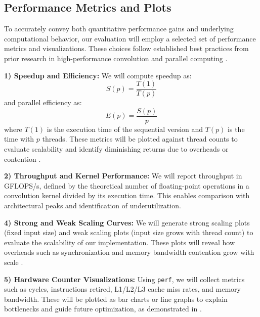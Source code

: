 \documentclass[conference, 10pt]{IEEEtran}
\begin{document}
\subsection{Performance Metrics and Plots}

To accurately convey both quantitative performance gains and underlying computational behavior, our evaluation will employ a selected set of performance metrics and visualizations. These choices follow established best practices from prior research in high-performance convolution and parallel computing \cite{Wang2023-ve,  hager2021hpc, Rajput2013-qn, Yoon2012-sx}.

\vspace{0.5em}
\textbf{1) Speedup and Efficiency:} 
We will compute speedup as:
\begin{equation}
    S(p) = \frac{T(1)}{T(p)}
\end{equation}
and parallel efficiency as:
\begin{equation}
    E(p) = \frac{S(p)}{p}
\end{equation}
where \(T(1)\) is the execution time of the sequential version and \(T(p)\) is the time with \(p\) threads. These metrics will be plotted against thread counts to evaluate scalability and identify diminishing returns due to overheads or contention \cite{Rajput2013-qn}.

\vspace{0.5em}
\textbf{2) Throughput and Kernel Performance:} 
We will report throughput in GFLOPS/s, defined by the theoretical number of floating-point operations in a convolution kernel divided by its execution time. This enables comparison with architectural peaks and identification of underutilization.

\vspace{0.5em}
\textbf{4) Strong and Weak Scaling Curves:} 
We will generate strong scaling plots (fixed input size) and weak scaling plots (input size grows with thread count) to evaluate the scalability of our implementation. These plots will reveal how overheads such as synchronization and memory bandwidth contention grow with scale \cite{hager2021hpc}.

\vspace{0.5em}
\textbf{5) Hardware Counter Visualizations:} 
Using \texttt{perf}, we will collect metrics such as cycles, instructions retired, L1/L2/L3 cache miss rates, and memory bandwidth. These will be plotted as bar charts or line graphs to explain bottlenecks and guide future optimization, as demonstrated in \cite{Yoon2012-sx}.
\end{document}
